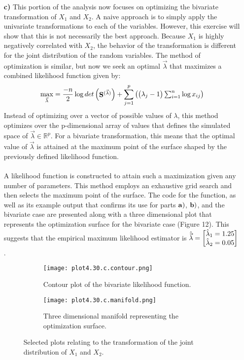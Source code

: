 \begin{enumerate}
	\item[\bf{c)}] This portion of the analysis now focuses on optimizing the bivariate transformation of $X_1$ and $X_2$. A naive approach is to simply apply the univariate transformations to each of the variables. However, this exercise will show that this is not necessarily the best approach. Because $X_1$ is highly negatively correlated with $X_2$, the behavior of the transformation is different for the joint distribution of the random variables. The method of optimization is similar, but now we seek an optimal $\vec{\lambda}$ that maximizes a combined likelihood function given by: $$\max_{\vec{\lambda}}=\frac{-n}{2} \log{det \begin{pmatrix}\mathrm{\bf{S}}^{(\vec{\lambda})}\end{pmatrix}} + \sum_{j=1}^p \begin{pmatrix}\begin{pmatrix}\lambda_j - 1\end{pmatrix} \sum_{i=1}^n \log{x_{ij}}\end{pmatrix}$$ Instead of optimizing over a vector of possible values of $\lambda$, this method optimizes over the p-dimensional array of values that defines the simulated space of $\vec{\lambda} \in \mathbb{R}^p$. For a bivariate transformation, this means that the optimal value of $\vec{\lambda}$ is attained at the maximum point of the surface shaped by the previously defined likelihood function. \\
		\\
		A likelihood function is constructed to attain such a maximization given any number of parameters. This method employs an exhaustive grid search and then selects the maximum point of the surface. The code for the function, as well as its example output that confirms its use for parts $\bf{a)}$, $\bf{b)}$, and the bivariate case are presented along with a three dimensional plot that represents the optimization surface for the bivariate case (Figure 12). This suggests that the empirical maximum likelihood estimator is $\hat{\vec{\lambda}} = \m{\hat{\lambda}_1 = 1.25 \\ \hat{\lambda}_2 = 0.05}$.
\begin{figure}[H]
\begin{subfigure}{.5\textwidth}
  \centering
	\texttt{[image: plot4.30.c.contour.png]}
	\caption{Contour plot of the bivariate likelihood function.}
  \label{fig:sfig1}
\end{subfigure}%
\begin{subfigure}{.5\textwidth}
  \centering
	\texttt{[image: plot4.30.c.manifold.png]}
  \caption{Three dimensional manifold representing the optimization surface.}
  \label{fig:sfig2}
\end{subfigure}
\caption{Selected plots relating to the transformation of the joint distribution of $X_1$ and $X_2$.}
\end{figure}


\end{enumerate}





